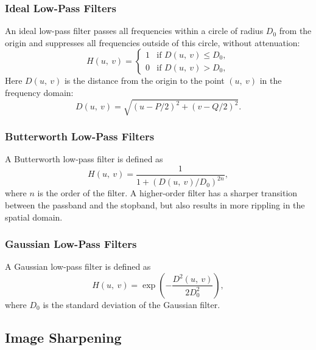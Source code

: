 \documentclass{article}
\begin{document}
\subsubsection{Ideal Low-Pass Filters}
An ideal low-pass filter passes all frequencies within a circle of
radius \(D_0\) from the origin and suppresses all frequencies outside
of this circle, without attenuation:
\begin{equation*}
    H\left( u,\: v \right) =
    \begin{cases}
        1 & \text{if } D\left( u,\: v \right) \leq D_0, \\
        0 & \text{if } D\left( u,\: v \right) > D_0,
    \end{cases}
\end{equation*}
Here \(D\left( u,\: v \right)\) is the distance from the origin to the
point \(\left( u,\: v \right)\) in the frequency domain:
\begin{equation*}
    D\left( u,\: v \right) = \sqrt{\left( u - P/2 \right)^2 + \left( v - Q/2 \right)^2}.
\end{equation*}
\subsubsection{Butterworth Low-Pass Filters}
A Butterworth low-pass filter is defined as
\begin{equation*}
    H\left( u,\: v \right) = \frac{1}{1 + \left( D\left( u,\: v \right)/D_0 \right)^{2n}},
\end{equation*}
where \(n\) is the order of the filter. A higher-order filter has a
sharper transition between the passband and the stopband, but also
results in more rippling in the spatial domain.
\subsubsection{Gaussian Low-Pass Filters}
A Gaussian low-pass filter is defined as
\begin{equation*}
    H\left( u,\: v \right) = \exp{\left( -\frac{D^2\left( u,\: v \right)}{2D_0^2} \right)},
\end{equation*}
where \(D_0\) is the standard deviation of the Gaussian filter.
\subsection{Image Sharpening}
\end{document}
